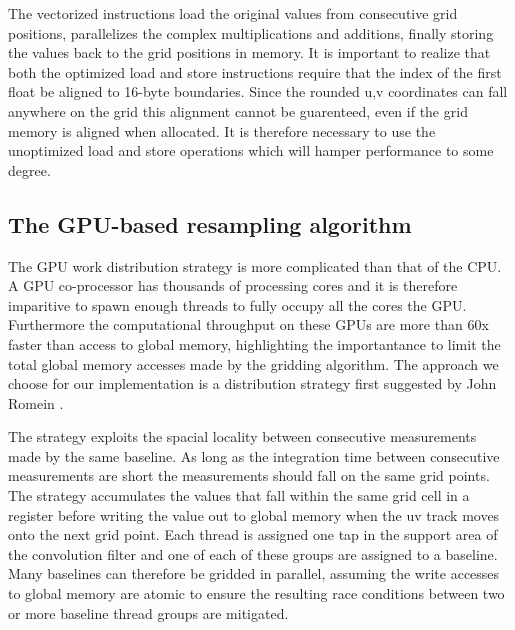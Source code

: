 The vectorized instructions load the original values from consecutive grid positions, parallelizes the complex multiplications and additions, finally storing the values back to the grid positions in memory. It is important to
realize that both the optimized load and store instructions require that the index of the first float be aligned to 16-byte boundaries. Since the rounded u,v coordinates can fall anywhere on the grid this alignment cannot be guarenteed,
even if the grid memory is aligned when allocated. It is therefore necessary to use the unoptimized load and store operations which will hamper performance to some degree.

\subsection{The GPU-based resampling algorithm}
The GPU work distribution strategy is more complicated than that of the CPU. A GPU co-processor has thousands of processing cores and it is therefore imparitive to spawn enough threads to fully
occupy all the cores the GPU. Furthermore the computational throughput on these GPUs are more than 60x faster than access to global memory, highlighting the importantance to limit the total global 
memory accesses made by the gridding algorithm. The approach we choose for our implementation is a distribution strategy first
suggested by John Romein \cite{romein2012efficient}.

The strategy exploits the spacial locality between consecutive measurements made by the same baseline. As long as the integration time
between consecutive measurements are short the measurements should fall on the same grid points. The strategy accumulates the values that fall 
within the same grid cell in a register before writing the value out to global memory when the uv track moves onto the next grid point.
Each thread is assigned one tap in the support area of the convolution filter and one of each of these groups are assigned to a baseline.
Many baselines can therefore be gridded in parallel, assuming the write accesses to global memory are atomic to ensure the resulting race conditions
between two or more baseline thread groups are mitigated.

